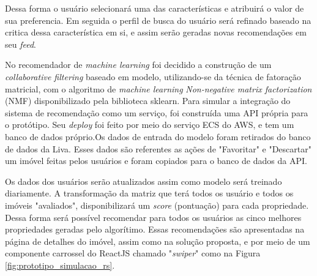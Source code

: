 Dessa forma o usuário selecionará uma das características e atribuirá o valor de sua preferencia. Em seguida o perfil de busca do usuário será refinado baseado na critica dessa característica em si, e assim serão geradas novas recomendações em seu \textit{feed}.

No recomendador de \textit{machine learning} foi decidido a construção de um \textit{collaborative filtering} baseado em modelo, utilizando-se da técnica de fatoração matricial, com o algoritmo de \textit{machine learning} \textit{Non-negative matrix factorization} (NMF) disponibilizado pela biblioteca sklearn. Para simular a integração do sistema de recomendação como um serviço, foi construída uma API própria para o protótipo. Seu \textit{deploy} foi feito por meio do serviço ECS do AWS, e tem um banco de dados próprio.Os dados de entrada do modelo foram retirados do banco de dados da Liva. Esses dados são referentes as ações de "Favoritar" e "Descartar" um imóvel feitas pelos usuários e foram copiados para o banco de dados da API.

Os dados dos usuários serão atualizados assim como modelo será treinado diariamente. A transformação da matriz que terá todos os usuário e todos os imóveis "avaliados", disponibilizará um \textit{score} (pontuação) para cada propriedade. Dessa forma será possível recomendar para todos os usuários as cinco melhores propriedades geradas pelo algorítimo. Essas recomendações são apresentadas na página de detalhes do imóvel, assim como na solução proposta, e por meio de um componente carrossel do ReactJS chamado "\textit{swiper}" como na Figura \ref{fig:prototipo_simulacao_rs}.

